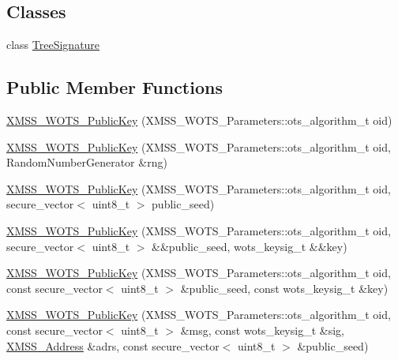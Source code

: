 \subsection*{Classes}
\begin{DoxyCompactItemize}
\item 
class \hyperlink{class_botan_1_1_x_m_s_s___w_o_t_s___public_key_1_1_tree_signature}{Tree\+Signature}
\end{DoxyCompactItemize}
\subsection*{Public Member Functions}
\begin{DoxyCompactItemize}
\item 
\hyperlink{class_botan_1_1_x_m_s_s___w_o_t_s___public_key_a7fb721c64c4e4e95d7b253e24942dfe0}{X\+M\+S\+S\+\_\+\+W\+O\+T\+S\+\_\+\+Public\+Key} (X\+M\+S\+S\+\_\+\+W\+O\+T\+S\+\_\+\+Parameters\+::ots\+\_\+algorithm\+\_\+t oid)
\item 
\hyperlink{class_botan_1_1_x_m_s_s___w_o_t_s___public_key_a3fb0d9f974c41f2be8c5e14a0ad39403}{X\+M\+S\+S\+\_\+\+W\+O\+T\+S\+\_\+\+Public\+Key} (X\+M\+S\+S\+\_\+\+W\+O\+T\+S\+\_\+\+Parameters\+::ots\+\_\+algorithm\+\_\+t oid, Random\+Number\+Generator \&rng)
\item 
\hyperlink{class_botan_1_1_x_m_s_s___w_o_t_s___public_key_a99e8be1233998e9375321051722fa40e}{X\+M\+S\+S\+\_\+\+W\+O\+T\+S\+\_\+\+Public\+Key} (X\+M\+S\+S\+\_\+\+W\+O\+T\+S\+\_\+\+Parameters\+::ots\+\_\+algorithm\+\_\+t oid, secure\+\_\+vector$<$ uint8\+\_\+t $>$ public\+\_\+seed)
\item 
\hyperlink{class_botan_1_1_x_m_s_s___w_o_t_s___public_key_a107a21510470543ddb752834e8f08594}{X\+M\+S\+S\+\_\+\+W\+O\+T\+S\+\_\+\+Public\+Key} (X\+M\+S\+S\+\_\+\+W\+O\+T\+S\+\_\+\+Parameters\+::ots\+\_\+algorithm\+\_\+t oid, secure\+\_\+vector$<$ uint8\+\_\+t $>$ \&\&public\+\_\+seed, wots\+\_\+keysig\+\_\+t \&\&key)
\item 
\hyperlink{class_botan_1_1_x_m_s_s___w_o_t_s___public_key_a779c569407ba1dfd3d196a163655d45f}{X\+M\+S\+S\+\_\+\+W\+O\+T\+S\+\_\+\+Public\+Key} (X\+M\+S\+S\+\_\+\+W\+O\+T\+S\+\_\+\+Parameters\+::ots\+\_\+algorithm\+\_\+t oid, const secure\+\_\+vector$<$ uint8\+\_\+t $>$ \&public\+\_\+seed, const wots\+\_\+keysig\+\_\+t \&key)
\item 
\hyperlink{class_botan_1_1_x_m_s_s___w_o_t_s___public_key_a79d8a0be458add3ecdc137f7556b1b80}{X\+M\+S\+S\+\_\+\+W\+O\+T\+S\+\_\+\+Public\+Key} (X\+M\+S\+S\+\_\+\+W\+O\+T\+S\+\_\+\+Parameters\+::ots\+\_\+algorithm\+\_\+t oid, const secure\+\_\+vector$<$ uint8\+\_\+t $>$ \&msg, const wots\+\_\+keysig\+\_\+t \&sig, \hyperlink{class_botan_1_1_x_m_s_s___address}{X\+M\+S\+S\+\_\+\+Address} \&adrs, const secure\+\_\+vector$<$ uint8\+\_\+t $>$ \&public\+\_\+seed)

\end{DoxyCompactItemize}
